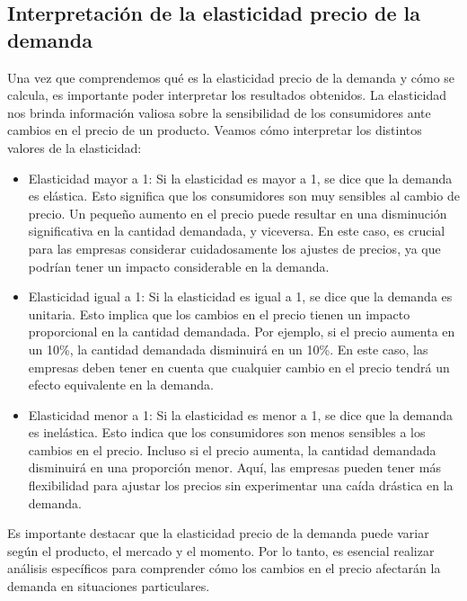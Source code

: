 \documentclass[
  a4paper,
]{article}
\begin{document}
\hypertarget{interpretaciuxf3n-de-la-elasticidad-precio-de-la-demanda}{%
\subsection{Interpretación de la elasticidad precio de la
demanda}\label{interpretaciuxf3n-de-la-elasticidad-precio-de-la-demanda}}

Una vez que comprendemos qué es la elasticidad precio de la demanda y
cómo se calcula, es importante poder interpretar los resultados
obtenidos. La elasticidad nos brinda información valiosa sobre la
sensibilidad de los consumidores ante cambios en el precio de un
producto. Veamos cómo interpretar los distintos valores de la
elasticidad:

\begin{itemize}
\item
  Elasticidad mayor a 1: Si la elasticidad es mayor a 1, se dice que la
  demanda es elástica. Esto significa que los consumidores son muy
  sensibles al cambio de precio. Un pequeño aumento en el precio puede
  resultar en una disminución significativa en la cantidad demandada, y
  viceversa. En este caso, es crucial para las empresas considerar
  cuidadosamente los ajustes de precios, ya que podrían tener un impacto
  considerable en la demanda.
\item
  Elasticidad igual a 1: Si la elasticidad es igual a 1, se dice que la
  demanda es unitaria. Esto implica que los cambios en el precio tienen
  un impacto proporcional en la cantidad demandada. Por ejemplo, si el
  precio aumenta en un 10\%, la cantidad demandada disminuirá en un
  10\%. En este caso, las empresas deben tener en cuenta que cualquier
  cambio en el precio tendrá un efecto equivalente en la demanda.
\item
  Elasticidad menor a 1: Si la elasticidad es menor a 1, se dice que la
  demanda es inelástica. Esto indica que los consumidores son menos
  sensibles a los cambios en el precio. Incluso si el precio aumenta, la
  cantidad demandada disminuirá en una proporción menor. Aquí, las
  empresas pueden tener más flexibilidad para ajustar los precios sin
  experimentar una caída drástica en la demanda.
\end{itemize}

Es importante destacar que la elasticidad precio de la demanda puede
variar según el producto, el mercado y el momento. Por lo tanto, es
esencial realizar análisis específicos para comprender cómo los cambios
en el precio afectarán la demanda en situaciones particulares.
\end{document}
